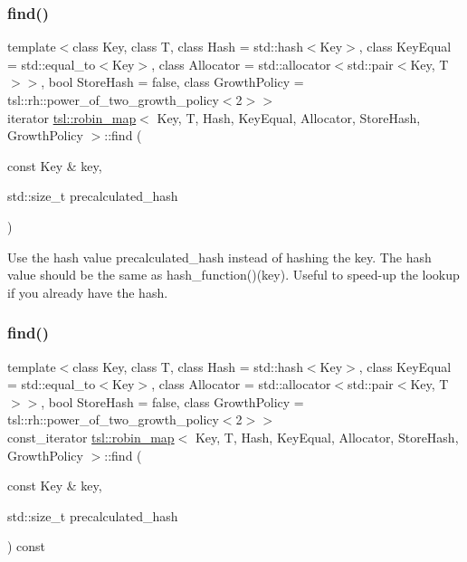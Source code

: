 \subsubsection{\texorpdfstring{find()}{find()}\hspace{0.1cm}{\footnotesize\ttfamily [1/6]}}
{\footnotesize\ttfamily template$<$class Key, class T, class Hash = std\+::hash$<$\+Key$>$, class Key\+Equal = std\+::equal\+\_\+to$<$\+Key$>$, class Allocator = std\+::allocator$<$std\+::pair$<$\+Key, T$>$$>$, bool Store\+Hash = false, class Growth\+Policy = tsl\+::rh\+::power\+\_\+of\+\_\+two\+\_\+growth\+\_\+policy$<$2$>$$>$ \\
iterator \mbox{\hyperlink{classtsl_1_1robin__map}{tsl\+::robin\+\_\+map}}$<$ Key, T, Hash, Key\+Equal, Allocator, Store\+Hash, Growth\+Policy $>$\+::find (\begin{DoxyParamCaption}\item[{const Key \&}]{key,  }\item[{std\+::size\+\_\+t}]{precalculated\+\_\+hash }\end{DoxyParamCaption})\hspace{0.3cm}{\ttfamily [inline]}}

Use the hash value \textquotesingle{}precalculated\+\_\+hash\textquotesingle{} instead of hashing the key. The hash value should be the same as hash\+\_\+function()(key). Useful to speed-\/up the lookup if you already have the hash. \mbox{\label{classtsl_1_1robin__map_a332b9d3702e9f5b7ae356857a4c03e01}} 
\subsubsection{\texorpdfstring{find()}{find()}\hspace{0.1cm}{\footnotesize\ttfamily [2/6]}}
{\footnotesize\ttfamily template$<$class Key, class T, class Hash = std\+::hash$<$\+Key$>$, class Key\+Equal = std\+::equal\+\_\+to$<$\+Key$>$, class Allocator = std\+::allocator$<$std\+::pair$<$\+Key, T$>$$>$, bool Store\+Hash = false, class Growth\+Policy = tsl\+::rh\+::power\+\_\+of\+\_\+two\+\_\+growth\+\_\+policy$<$2$>$$>$ \\
const\+\_\+iterator \mbox{\hyperlink{classtsl_1_1robin__map}{tsl\+::robin\+\_\+map}}$<$ Key, T, Hash, Key\+Equal, Allocator, Store\+Hash, Growth\+Policy $>$\+::find (\begin{DoxyParamCaption}\item[{const Key \&}]{key,  }\item[{std\+::size\+\_\+t}]{precalculated\+\_\+hash }\end{DoxyParamCaption}) const\hspace{0.3cm}{\ttfamily [inline]}}






